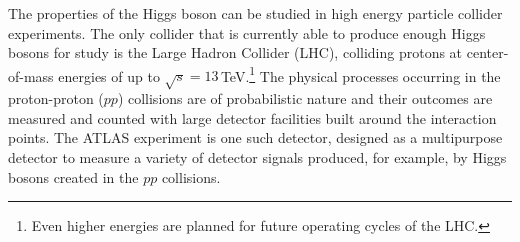 
The properties of the Higgs boson can be studied in high energy particle collider experiments. 
The only collider that is currently able to produce enough Higgs bosons for study is the Large Hadron Collider (LHC), colliding protons at center-of-mass energies of up to $\sqrt{s} = 13\,$TeV.\footnote{Even higher energies are planned for future operating cycles of the LHC.}
The physical processes occurring in the proton-proton ($pp$) collisions are of probabilistic nature and their outcomes are measured and counted with large detector facilities built around the interaction points. 
The ATLAS experiment is one such detector, designed as a multipurpose detector to measure a variety of detector signals produced, for example, by Higgs bosons created in the $pp$ collisions.

